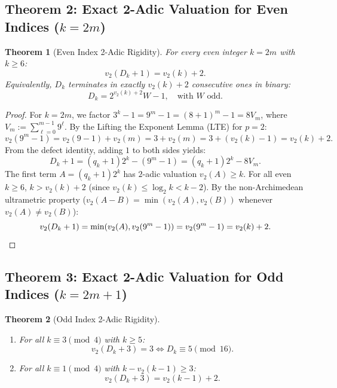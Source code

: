 \documentclass[11pt,reqno]{amsart}
\newtheorem{theorem}{Theorem}[section]
\theoremstyle{definition}
\numberwithin{equation}{section}
\begin{document}
\subsection{\texorpdfstring{Theorem 2: Exact 2-Adic Valuation for Even Indices ($k = 2m$)}{Theorem 2: Exact 2-Adic Valuation for Even Indices (k = 2m)}}

\begin{theorem}[Even Index 2-Adic Rigidity]\label{thm:even_lte}
For every even integer $k = 2m$ with $k \ge 6$:
\begin{equation}\label{eq:even_valuation}
v_2(D_k + 1) = v_2(k) + 2.
\end{equation}
Equivalently, $D_k$ terminates in exactly $v_2(k) + 2$ consecutive ones in binary:
\begin{equation}
D_k = 2^{v_2(k)+2} W - 1, \quad \text{with } W \text{ odd}.
\end{equation}
\end{theorem}

\begin{proof}
For $k = 2m$, we factor $3^k - 1 = 9^m - 1 = (8 + 1)^m - 1 = 8 V_m$, where $V_m := \sum_{\ell=0}^{m-1} 9^\ell$.
By the Lifting the Exponent Lemma (LTE) for $p = 2$:
\[
v_2(9^m - 1) = v_2(9 - 1) + v_2(m) = 3 + v_2(m) = 3 + (v_2(k) - 1) = v_2(k) + 2.
\]
From the defect identity, adding $1$ to both sides yields:
\[
D_k + 1 = (q_k + 1)2^k - (9^m - 1) = (q_k + 1)2^k - 8 V_m.
\]
The first term $A = (q_k + 1)2^k$ has $2$-adic valuation $v_2(A) \ge k$.
For all even $k \ge 6$, $k > v_2(k) + 2$ (since $v_2(k) \le \log_2 k < k - 2$).
By the non-Archimedean ultrametric property ($v_2(A - B) = \min(v_2(A), v_2(B))$ whenever $v_2(A) \ne v_2(B)$):
\[
v_2(D_k + 1) = \min(v_2(A), v_2(9^m - 1)) = v_2(9^m - 1) = v_2(k) + 2. \qedhere
\]
\end{proof}

\subsection{\texorpdfstring{Theorem 3: Exact 2-Adic Valuation for Odd Indices ($k = 2m+1$)}{Theorem 3: Exact 2-Adic Valuation for Odd Indices (k = 2m+1)}}

\begin{theorem}[Odd Index 2-Adic Rigidity]\label{thm:odd_lte}
\hfill
\begin{enumerate}
    \item For all $k \equiv 3 \pmod 4$ with $k \ge 5$:
    \begin{equation}
    v_2(D_k + 3) = 3 \iff D_k \equiv 5 \pmod{16}.
    \end{equation}
    \item For all $k \equiv 1 \pmod 4$ with $k - v_2(k - 1) \ge 3$:
    \begin{equation}
    v_2(D_k + 3) = v_2(k - 1) + 2.
    \end{equation}
\end{enumerate}
\end{theorem}
\end{document}

